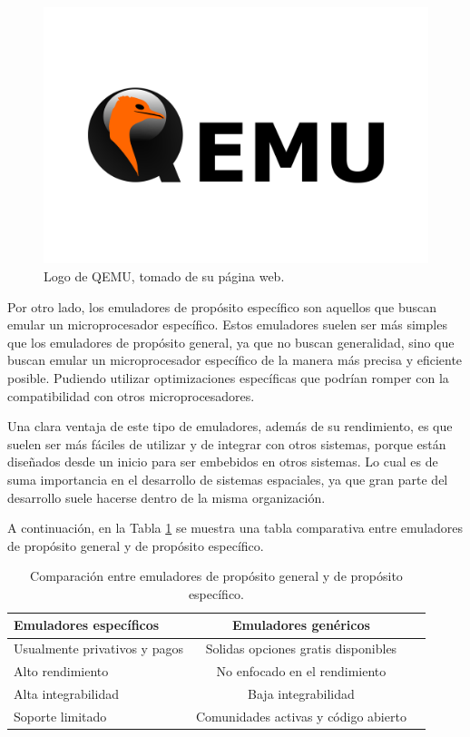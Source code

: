 \begin{figure}[htbp]
	\centering
	\includegraphics[width=.6\textwidth]{./Figures/qemu}
	\caption{Logo de QEMU, tomado de su página web.}
	\label{fig:qemu}
\end{figure}


Por otro lado, los emuladores de propósito específico son aquellos que buscan emular un microprocesador específico. Estos emuladores suelen ser más simples que los emuladores de propósito general, ya que no buscan generalidad, sino que buscan emular un microprocesador específico de la manera más precisa y eficiente posible. Pudiendo utilizar optimizaciones específicas que podrían romper con la compatibilidad con otros microprocesadores.

Una clara ventaja de este tipo de emuladores, además de su rendimiento, es que suelen ser más fáciles de utilizar y de integrar con otros sistemas, porque están diseñados desde un inicio para ser embebidos en otros sistemas. Lo cual es de suma importancia en el desarrollo de sistemas espaciales, ya que gran parte del desarrollo suele hacerse dentro de la misma organización.

A continuación, en la Tabla \ref{tab:comparacion_emuladores} se muestra una tabla comparativa entre emuladores de propósito general y de propósito específico.

\begin{table}[h]
	\centering
	\caption[Tipos de emuladores]{Comparación entre emuladores de propósito general y de propósito específico.}
	\begin{tabular}{l c c}
		\toprule
		\textbf{Emuladores específicos} & \textbf{Emuladores genéricos} \\
		\midrule
		Usualmente privativos y pagos & Solidas opciones gratis disponibles	\\
		Alto rendimiento	 & No enfocado en el rendimiento  \\
		Alta integrabilidad	 & Baja integrabilidad	 \\
		Soporte limitado & Comunidades activas y código abierto	 \\
		\bottomrule
		\hline
	\end{tabular}
	\label{tab:comparacion_emuladores}
\end{table}



